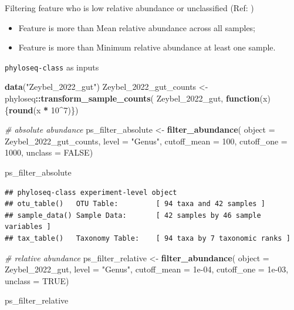 \documentclass[
]{book}
\newenvironment{Shaded}{\begin{snugshade}}{\end{snugshade}}
\newcommand{\AttributeTok}[1]{\textcolor[rgb]{0.13,0.29,0.53}{#1}}
\newcommand{\CommentTok}[1]{\textcolor[rgb]{0.56,0.35,0.01}{\textit{#1}}}
\newcommand{\ConstantTok}[1]{\textcolor[rgb]{0.56,0.35,0.01}{#1}}
\newcommand{\ControlFlowTok}[1]{\textcolor[rgb]{0.13,0.29,0.53}{\textbf{#1}}}
\newcommand{\DecValTok}[1]{\textcolor[rgb]{0.00,0.00,0.81}{#1}}
\newcommand{\FloatTok}[1]{\textcolor[rgb]{0.00,0.00,0.81}{#1}}
\newcommand{\FunctionTok}[1]{\textcolor[rgb]{0.13,0.29,0.53}{\textbf{#1}}}
\newcommand{\NormalTok}[1]{#1}
\newcommand{\OtherTok}[1]{\textcolor[rgb]{0.56,0.35,0.01}{#1}}
\newcommand{\SpecialCharTok}[1]{\textcolor[rgb]{0.81,0.36,0.00}{\textbf{#1}}}
\newcommand{\StringTok}[1]{\textcolor[rgb]{0.31,0.60,0.02}{#1}}
\begin{document}
Filtering feature who is low relative abundance or unclassified (Ref: \citep{thingholm2019obese})

\begin{itemize}
\item
  Feature is more than Mean relative abundance across all samples;
\item
  Feature is more than Minimum relative abundance at least one sample.
\end{itemize}

\texttt{phyloseq-class} as inputs

\begin{Shaded}
\begin{Highlighting}[]
\FunctionTok{data}\NormalTok{(}\StringTok{"Zeybel\_2022\_gut"}\NormalTok{)}
\NormalTok{Zeybel\_2022\_gut\_counts }\OtherTok{\textless{}{-}}\NormalTok{ phyloseq}\SpecialCharTok{::}\FunctionTok{transform\_sample\_counts}\NormalTok{(}
\NormalTok{Zeybel\_2022\_gut, }\ControlFlowTok{function}\NormalTok{(x) \{}\FunctionTok{round}\NormalTok{(x }\SpecialCharTok{*} \DecValTok{10}\SpecialCharTok{\^{}}\DecValTok{7}\NormalTok{)\})}

\CommentTok{\# absolute abundance}
\NormalTok{ps\_filter\_absolute }\OtherTok{\textless{}{-}} \FunctionTok{filter\_abundance}\NormalTok{(}
   \AttributeTok{object =}\NormalTok{ Zeybel\_2022\_gut\_counts,}
   \AttributeTok{level =} \StringTok{"Genus"}\NormalTok{,}
   \AttributeTok{cutoff\_mean =} \DecValTok{100}\NormalTok{,}
   \AttributeTok{cutoff\_one =} \DecValTok{1000}\NormalTok{,}
   \AttributeTok{unclass =} \ConstantTok{FALSE}\NormalTok{)}

\NormalTok{ps\_filter\_absolute}
\end{Highlighting}
\end{Shaded}

\begin{verbatim}
## phyloseq-class experiment-level object
## otu_table()   OTU Table:         [ 94 taxa and 42 samples ]
## sample_data() Sample Data:       [ 42 samples by 46 sample variables ]
## tax_table()   Taxonomy Table:    [ 94 taxa by 7 taxonomic ranks ]
\end{verbatim}

\begin{Shaded}
\begin{Highlighting}[]
\CommentTok{\# relative abundance}
\NormalTok{ps\_filter\_relative }\OtherTok{\textless{}{-}} \FunctionTok{filter\_abundance}\NormalTok{(}
   \AttributeTok{object =}\NormalTok{ Zeybel\_2022\_gut,}
   \AttributeTok{level =} \StringTok{"Genus"}\NormalTok{,}
   \AttributeTok{cutoff\_mean =} \FloatTok{1e{-}04}\NormalTok{,}
   \AttributeTok{cutoff\_one =} \FloatTok{1e{-}03}\NormalTok{,}
   \AttributeTok{unclass =} \ConstantTok{TRUE}\NormalTok{)}

\NormalTok{ps\_filter\_relative}
\end{Highlighting}
\end{Shaded}
\end{document}
